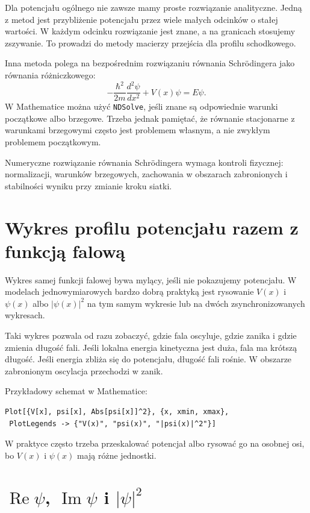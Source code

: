 Dla potencjału ogólnego nie zawsze mamy proste rozwiązanie analityczne. Jedną z metod jest przybliżenie potencjału przez wiele małych odcinków o stałej wartości. W każdym odcinku rozwiązanie jest znane, a na granicach stosujemy zszywanie. To prowadzi do metody macierzy przejścia dla profilu schodkowego.

Inna metoda polega na bezpośrednim rozwiązaniu równania Schrödingera jako równania różniczkowego:
\begin{equation}
    -\frac{\hbar^2}{2m}\frac{d^2\psi}{dx^2}+V(x)\psi=E\psi.
\end{equation}
W Mathematice można użyć \texttt{NDSolve}, jeśli znane są odpowiednie warunki początkowe albo brzegowe. Trzeba jednak pamiętać, że równanie stacjonarne z warunkami brzegowymi często jest problemem własnym, a nie zwykłym problemem początkowym.

\begin{remarkbox}
Numeryczne rozwiązanie równania Schrödingera wymaga kontroli fizycznej: normalizacji, warunków brzegowych, zachowania w obszarach zabronionych i stabilności wyniku przy zmianie kroku siatki.
\end{remarkbox}

\section{Wykres profilu potencjału razem z funkcją falową}

Wykres samej funkcji falowej bywa mylący, jeśli nie pokazujemy potencjału. W modelach jednowymiarowych bardzo dobrą praktyką jest rysowanie \(V(x)\) i \(\psi(x)\) albo \(|\psi(x)|^2\) na tym samym wykresie lub na dwóch zsynchronizowanych wykresach.

Taki wykres pozwala od razu zobaczyć, gdzie fala oscyluje, gdzie zanika i gdzie zmienia długość fali. Jeśli lokalna energia kinetyczna jest duża, fala ma krótszą długość. Jeśli energia zbliża się do potencjału, długość fali rośnie. W obszarze zabronionym oscylacja przechodzi w zanik.

Przykładowy schemat w Mathematice:
\begin{verbatim}
Plot[{V[x], psi[x], Abs[psi[x]]^2}, {x, xmin, xmax},
 PlotLegends -> {"V(x)", "psi(x)", "|psi(x)|^2"}]
\end{verbatim}
W praktyce często trzeba przeskalować potencjał albo rysować go na osobnej osi, bo \(V(x)\) i \(\psi(x)\) mają różne jednostki.

\section{\texorpdfstring{\(\operatorname{Re}\psi\)}{Re psi}, \texorpdfstring{\(\operatorname{Im}\psi\)}{Im psi} i \texorpdfstring{\(|\psi|^2\)}{|psi|^2}}

